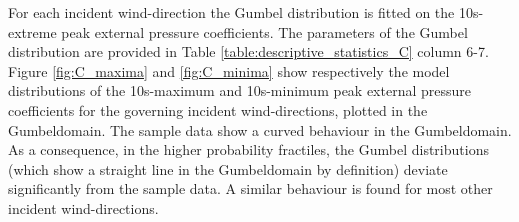 \noindent
For each incident wind-direction the Gumbel distribution is fitted on the 10s-extreme peak external pressure coefficients. 
The parameters of the Gumbel distribution are provided in Table 
\ref{table:descriptive_statistics_C}                                                              column 6-7. Figure \ref{fig:C_maxima} and \ref{fig:C_minima} show respectively the model distributions of the 10s-maximum and 10s-minimum peak external pressure coefficients for the governing incident wind-directions, plotted in the Gumbeldomain. The sample data show a curved behaviour in the Gumbeldomain. As a consequence, in the higher probability fractiles, the Gumbel distributions (which show a straight line in the Gumbeldomain by definition) deviate significantly from the sample data. A similar behaviour is found for most other incident wind-directions. 

